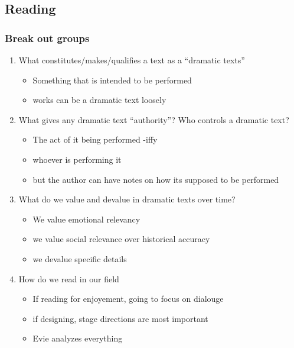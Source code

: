 \documentclass[12pt]{article}
\begin{document}
        \subsection{Reading}
            \subsubsection{Break out groups}
                \begin{enumerate}
                    \item What constitutes/makes/qualifies a text as a ``dramatic texts''
                    \begin{itemize}
                        \item Something that is intended to be performed
                        \item works can be a dramatic text loosely
                    \end{itemize}
                    \item What gives any dramatic text ``authority''? Who controls a dramatic text?
                    \begin{itemize}
                        \item The act of it being performed -iffy
                        \item whoever is performing it
                        \item but the author can have notes on how its supposed to be performed
                    \end{itemize}
                    \item What do we value and devalue in dramatic texts over time?
                    \begin{itemize}
                        \item We value emotional relevancy
                        \item we value social relevance over historical accuracy
                        \item we devalue specific details
                    \end{itemize}
                    \item How do we read in our field
                    \begin{itemize}
                        \item If reading for enjoyement, going to focus on dialouge
                        \item if designing, stage directions are most important
                        \item Evie analyzes everything
                    \end{itemize}
                \end{enumerate}
\end{document}
